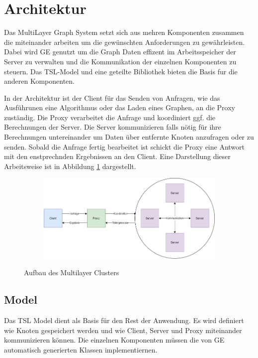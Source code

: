 
\section{Architektur}

Das MultiLayer Graph System setzt sich aus mehren Komponenten zusammen die miteinander arbeiten um die gewünschten Anforderungen zu gewährleisten.
Dabei wird GE genutzt um die Graph Daten effizent im Arbeitsspeicher der Server zu verwalten und die Kommunikation der einzelnen Komponenten zu steuern.  Das TSL-Model und eine geteilte Bibliothek bieten die Basis fur die
anderen Komponenten.

In der Architektur ist der Client für das Senden von Anfragen, wie das Ausführunen eine Algorithmus oder das Laden eines Graphen, an die Proxy zuständig.
Die Proxy verarbeitet die Anfrage und koordiniert ggf. die Berechnungen der Server. Die Server kommunizieren falls nötig für ihre Berechnungen untereinander um Daten über entfernte Knoten anzufragen oder zu senden. Sobald die Anfrage fertig bearbeitet ist schickt die Proxy eine Antwort mit den enstprechnden Ergebnissen an den Client.
Eine Darstellung dieser Arbeitsweise ist in Abbildung \ref{architektur} dargestellt.

\begin{figure}
  \centering
  \begin{subfigure}[b]{1.0\textwidth}
    \includegraphics[width=1.0\linewidth]{img/Architektur-Cluster.png}
  \end{subfigure}
  \caption{Aufbau des Multilayer Clusters}
  \label{architektur}
\end{figure}



\subsection{Model}

Das TSL Model dient als Basis für den Rest der Anwendung. Es wird definiert wie Knoten gespeichert werden und wie Client, Server und Proxy miteinander
kommunizieren können. Die einzelnen Komponenten müssen die von GE automatisch generierten Klassen implementiernen.


